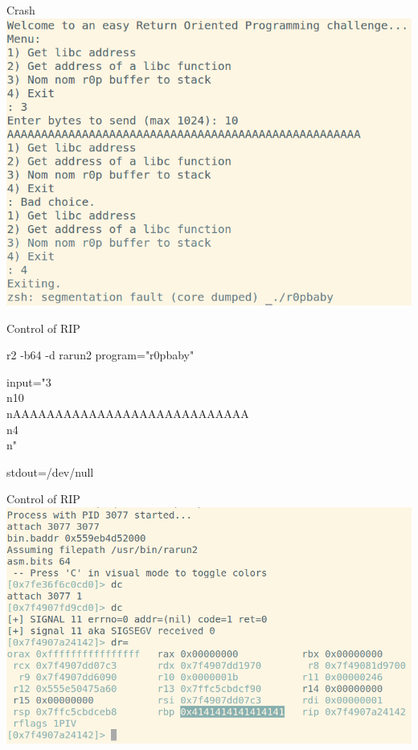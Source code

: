 \documentclass{beamer}
\begin{document}
\begin{frame}{Crash}
    \includegraphics[width=\textwidth]{r0pbaby_crash.png}
\end{frame}

\begin{frame}{Control of RIP}
    \begin{semiverbatim}
    r2 -b64 -d rarun2 program="r0pbaby"

    input="3\\n10\\nAAAAAAAAAAAAAAAAAAAAAAAAAAAA\\n4\\n"

    stdout=/dev/null
\end{semiverbatim}
\end{frame}

\begin{frame}{Control of RIP}
    \includegraphics[width=\textwidth]{r0pbaby_r2d.png}
\end{frame}
\end{document}
